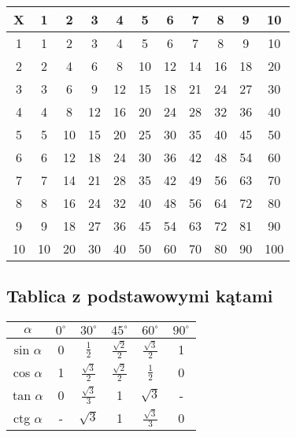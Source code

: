 \documentclass[a4paper]{article}
\begin{document}
	\begin{tabular}{|c|c|c|c|c|c|c|c|c|c|c|}

 \hline 
	 X & 1 & 2 & 3 & 4 & 5 & 6 & 7 & 8 & 9 & 10 \\
 \hline 
 	1 & 1 & 2 & 3 & 4 & 5 & 6 & 7 & 8 & 9 & 10 \\
 \hline 
	2 & 2 & 4 & 6 & 8 & 10 & 12 & 14 & 16 & 18 & 20 \\
\hline 
 	3 & 3 & 6 & 9 & 12 & 15 & 18 & 21 & 24 & 27 & 30 \\
\hline 
 	4 & 4 & 8 & 12 & 16 & 20 & 24 & 28 & 32 & 36 & 40 \\
\hline 
 	5 & 5 & 10 & 15 & 20 & 25 & 30 & 35 & 40 & 45 & 50 \\
\hline 
 	6 & 6 & 12 & 18 & 24 & 30 & 36 & 42 & 48 & 54 & 60 \\
\hline 
 	7 & 7 & 14 & 21 & 28 & 35 & 42 & 49 & 56 & 63 & 70 \\
\hline 
 	8 & 8 & 16 & 24 & 32 & 40 & 48 & 56 & 64 & 72 & 80 \\
\hline 
 	9 & 9 & 18 & 27 & 36 & 45 & 54 & 63 & 72 & 81 & 90 \\
\hline 
 	10 & 10 & 20 & 30 & 40 & 50 & 60 & 70 & 80 & 90 & 100 \\
\hline 
\end{tabular} 
\label{tabmno}


	\subsection{Tablica z podstawowymi kątami}	
	\begin{tabular}{|c|c|c|c|c|c|}
 \hline 
	$\alpha$ & $0^{\circ}$ & $30^{\circ}$ & $45^{\circ}$ & $60^{\circ}$ & $90^{\circ}$  \\
 \hline 
 	sin $\alpha$ & 0 &  $\frac{1}{2}$ &  $\frac{\sqrt{2}}{2}$ & $\frac{\sqrt{3}}{2}$ & 1 \\
 \hline 
	cos $\alpha$ & 1 &  $\frac{\sqrt{3}}{2}$ &  $\frac{\sqrt{2}}{2}$ &  $\frac{1}{2}$  & 0  \\
\hline 
 	tan $\alpha$ & 0 &  $\frac{\sqrt{3}}{3}$ & 1 & $\sqrt{3}$ & -  \\
\hline 
 	ctg $\alpha$ & - & $\sqrt{3}$ & 1 &  $\frac{\sqrt{3}}{3}$ & 0  \\

\hline 
\end{tabular}
\label{tabkat}
\end{document}
